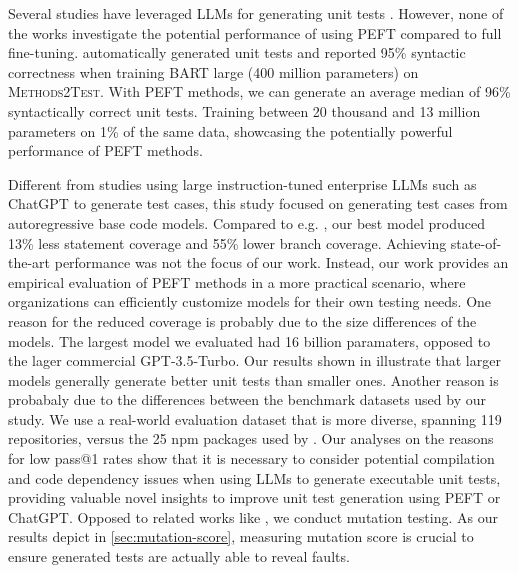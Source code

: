 \documentclass[12pt]{book}
\begin{document}
Several studies have leveraged LLMs for generating unit tests \citep{tufano2021unit, siddiq2024using, yuan2023manual, schäfer2023empirical, steenhoek2023reinforcement}. However, none of the works investigate the potential performance of using PEFT compared to full fine-tuning. \citet{tufano2021unit} automatically generated unit tests and reported 95\% syntactic correctness when training BART large (400 million parameters) \citep{lewis2019bart} on \textsc{Methods2Test}. With PEFT methods, we can generate an average median of 96\% syntactically correct unit tests. Training between 20 thousand and 13 million parameters on 1\% of the same data, showcasing the potentially powerful performance of PEFT methods.

Different from studies \citep{siddiq2024using, yuan2023manual, schäfer2023empirical} using large instruction-tuned enterprise LLMs such as ChatGPT to generate test cases, this study focused on generating test cases from autoregressive base code models. Compared to e.g. \citet{schäfer2023empirical}, our best model produced 13\% less statement coverage and 55\% lower branch coverage. Achieving state-of-the-art performance was not the focus of our work. Instead, our work provides an empirical evaluation of PEFT methods in a more practical scenario, where organizations can efficiently customize models for their own testing needs. One reason for the reduced coverage is probably due to the size differences of the models. The largest model we evaluated had 16 billion paramaters, opposed to the lager commercial GPT-3.5-Turbo. Our results shown in  illustrate that larger models generally generate better unit tests than smaller ones. Another reason is probabaly due to the differences between the benchmark datasets used by our study. We use a real-world evaluation dataset that is more diverse, spanning 119 repositories, versus the 25 npm packages used by \citet{siddiq2024using}. Our analyses on the reasons for low pass@1 rates show that it is necessary to consider potential compilation and code dependency issues when using LLMs to generate executable unit tests, providing valuable novel insights to improve unit test generation using PEFT or ChatGPT. Opposed to related works like \citep{siddiq2024using, yuan2023manual, schäfer2023empirical}, we conduct mutation testing. As our results depict in \cref{sec:mutation-score}, measuring mutation score is crucial to ensure generated tests are actually able to reveal faults.
\end{document}
